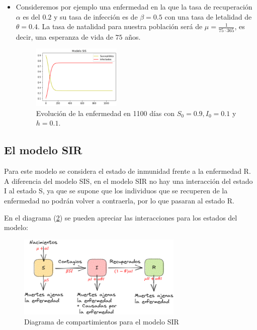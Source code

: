 \begin{itemize}
    \item Consideremos por ejemplo una enfermedad en la que la tasa de recuperación $\alpha$ es del $0.2$ y su tasa de infección es de $\beta=0.5$ con una tasa de letalidad de $\theta=0.4$. La tasa de natalidad para nuestra población será de $\mu=\frac{1}{75\cdot365}$, es decir, una esperanza de vida de $75$ años.
    
    \begin{figure}[h]
      \centering
        \includegraphics[width=0.4\textwidth]{Imagenes/ex1SIS.PNG}
      \caption{Evolución de la enfermedad en 1100 días con $S_0=0.9,I_0=0.1$ y $h=0.1$.}
      \label{fig:Ejemplo 2 - SIS}
    \end{figure}
\end{itemize}

\newpage

\subsection{El modelo SIR}\label{sub:modeloSIR}

Para este modelo se considera el estado de inmunidad frente a la enfermedad R. A diferencia del modelo SIS, en el modelo SIR no hay una interacción del estado I al estado S, ya que se supone que los individuos que se recuperen de la enfermedad no podrán volver a contraerla, por lo que pasaran al estado R. 

En el diagrama (\ref{fig:SIR}) se pueden apreciar las interacciones para los estados del modelo:

\begin{figure}[h]
  \centering
    \includegraphics[width=0.7\textwidth]{Imagenes/SIR_compartimientos.PNG}
  \caption{Diagrama de compartimientos para el modelo SIR}
  \label{fig:SIR}
\end{figure}


